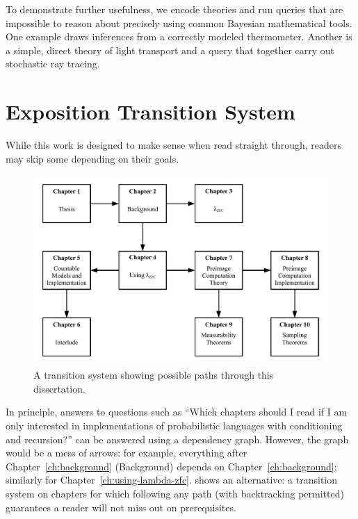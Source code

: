 To demonstrate further usefulness, we encode theories and run queries that are impossible to reason about precisely using common Bayesian mathematical tools.
One example draws inferences from a correctly modeled thermometer.
Another is a simple, direct theory of light transport and a query that together carry out stochastic ray tracing.

\section{Exposition Transition System}

While this work is designed to make sense when read straight through, readers may skip some depending on their goals.

\begin{figure}[!tb]\centering
\includegraphics[width=\textwidth]{figures/reading-graph}
\caption[A transition system for reading this dissertation]{A transition system showing possible paths through this dissertation.}
\label{fig:reading-graph}
\end{figure}

In principle, answers to questions such as ``Which chapters should I read if I am only interested in implementations of probabilistic languages with conditioning and recursion?'' can be answered using a dependency graph.
However, the graph would be a mess of arrows: for example, everything after Chapter~\ref{ch:background} (Background) depends on Chapter~\ref{ch:background}; similarly for Chapter~\ref{ch:using-lambda-zfc}.
 shows an alternative: a transition system on chapters for which following any path (with backtracking permitted) guarantees a reader will not miss out on prerequisites.

